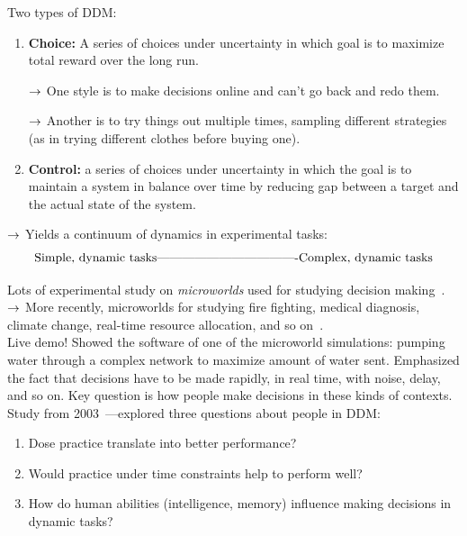 Two types of DDM:
\begin{enumerate}
    \item {\bf Choice:} A series of choices under uncertainty in which goal is to maximize total reward over the long run.
    
    $\rightarrow$ One style is to make decisions online and can't go back and redo them.
    
    $\rightarrow$ Another is to try things out multiple times, sampling different strategies (as in trying different clothes before buying one).
    
    \item {\bf Control:} a series of choices under uncertainty in which the goal is to maintain a system in balance over time by reducing gap between a target and the actual state of the system.
\end{enumerate}


$\rightarrow$ Yields a continuum of dynamics in experimental tasks:
\begin{equation}
    \text{Simple, dynamic tasks}\text{----------------------------------} \text{Complex, dynamic tasks}
\end{equation}

Lots of experimental study on {\it microworlds} used for studying decision making~\cite{difonzo1998microworlds}. \\

$\rightarrow$ More recently, microworlds for studying fire fighting, medical diagnosis, climate change, real-time resource allocation, and so on~\cite{gonzalez2005decision,gonzalez2005use}. \\

Live demo! Showed the software of one of the microworld simulations: pumping water through a complex network to maximize amount of water sent. Emphasized the fact that decisions have to be made rapidly, in real time, with noise, delay, and so on. Key question is how people make decisions in these kinds of contexts. \\

Study from 2003~\cite{gonzalez2003instance}---explored three questions about people in DDM:
\begin{enumerate}
    \item Dose practice translate into better performance?
    \item Would practice under time constraints help to perform well?
    \item How do human abilities (intelligence, memory) influence making decisions in dynamic tasks?
\end{enumerate}

